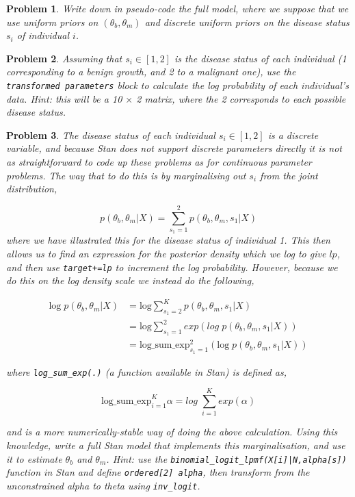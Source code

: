 \documentclass{article}
\newtheorem{problem}{Problem}[section]
\begin{document}
\begin{problem}
Write down in pseudo-code the full model, where we suppose that we use uniform priors on $(\theta_b,\theta_m)$ and discrete uniform priors on the disease status $s_i$ of individual $i$.
\end{problem}

\begin{problem}
Assuming that $s_i\in[1,2]$ is the disease status of each individual (1 corresponding to a benign growth, and 2 to a malignant one), use the \texttt{transformed parameters} block to calculate the log probability of each individual's data. Hint: this will be a 10 $\times$ 2 matrix, where the 2 corresponds to each possible disease status.
\end{problem}

\begin{problem}
The disease status of each individual $s_i\in[1,2]$ is a discrete variable, and because Stan does not support discrete parameters directly it is not as straightforward to code up these problems as for continuous parameter problems. The way that to do this is by marginalising out $s_i$ from the joint distribution,
	
\begin{equation}
p(\theta_b,\theta_m|X) = \sum_{s_1=1}^{2} p(\theta_b,\theta_m,s_1|X)
\end{equation}
where we have illustrated this for the disease status of individual 1. This then allows us to find an expression for the posterior density which we log to give $lp$, and then use \texttt{target+=lp} to increment the log probability. However, because we do this on the log density scale we instead do the following,

\begin{align}
\text{log} \; p(\theta_b,\theta_m|X) &= \text{log} \sum_{s_1=2}^{K} p(\theta_b,\theta_m,s_1|X)\\
&= \text{log} \sum_{s_1=1}^{2} exp\left( log\; p(\theta_b,\theta_m,s_1|X)\right)\\
&= \text{log}\_\text{sum}\_\text{exp}_{s_1=1}^{2}(\text{log}\; p(\theta_b,\theta_m,s_1|X))
\end{align}

where \texttt{log_sum_exp(.)} (a function available in Stan) is defined as,

\begin{equation}
\text{log\_sum\_exp}_{i=1}^{K} \alpha = log\; \sum_{i=1}^{K} exp(\alpha) 
\end{equation}
	
and is a more numerically-stable way of doing the above calculation. Using this knowledge, write a full Stan model that implements this marginalisation, and use it to estimate $\theta_b$ and $\theta_m$. Hint: use the \texttt{binomial_logit_lpmf(X[i]|N,alpha[s])} function in Stan and define \texttt{ordered[2] alpha}, then transform from the unconstrained alpha to theta using \texttt{inv_logit}.
\end{problem}
\end{document}
